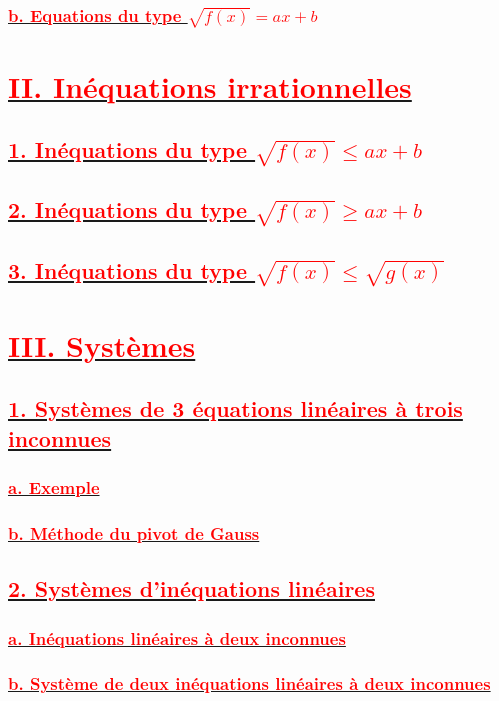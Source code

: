 \documentclass[12pt]{article}
\begin{document}
\subsubsection*{\underline{\textbf{\textcolor{red}{b. Equations du type \( \sqrt{f(x)} = ax+b \) }}}}

\section*{\underline{\textbf{\textcolor{red}{II. Inéquations irrationnelles}}}}
\subsection*{\underline{\textbf{\textcolor{red}{1. Inéquations du type \( \sqrt{f(x)} \leq ax+b \) }}}}
\subsection*{\underline{\textbf{\textcolor{red}{2. Inéquations du type \( \sqrt{f(x)} \geq ax+b \) }}}}
\subsection*{\underline{\textbf{\textcolor{red}{3. Inéquations du type \( \sqrt{f(x)} \leq  \sqrt{g(x)} \) }}}}

\section*{\underline{\textbf{\textcolor{red}{III. Systèmes}}}}
\subsection*{\underline{\textbf{\textcolor{red}{1. Systèmes de 3 équations linéaires à trois inconnues}}}}
\subsubsection*{\underline{\textbf{\textcolor{red}{a. Exemple}}}}
\subsubsection*{\underline{\textbf{\textcolor{red}{b. Méthode du pivot de Gauss }}}}
\subsection*{\underline{\textbf{\textcolor{red}{2. Systèmes d’inéquations linéaires }}}}
\subsubsection*{\underline{\textbf{\textcolor{red}{a. Inéquations linéaires à deux inconnues}}}}
\subsubsection*{\underline{\textbf{\textcolor{red}{b. Système de deux inéquations linéaires à deux inconnues }}}}
\end{document}
